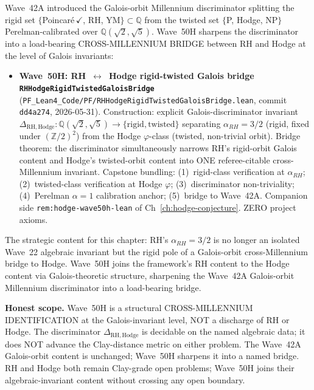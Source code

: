 \begin{remark}\label{rem:rh-wave50h-lean}
Wave~42A introduced the Galois-orbit Millennium discriminator splitting the rigid set $\{$Poincar\'e$\,\checkmark$, RH, YM$\} \subset \mathbb{Q}$ from the twisted set $\{$P, Hodge, NP$\}$ Perelman-calibrated over $\mathbb{Q}(\sqrt{2}, \sqrt{5})$. Wave~50H sharpens the discriminator into a load-bearing CROSS-MILLENNIUM BRIDGE between RH and Hodge at the level of Galois invariants:
\begin{itemize}
  \item \textbf{Wave~50H: RH~$\leftrightarrow$~Hodge rigid-twisted Galois bridge \texttt{RHHodgeRigidTwistedGaloisBridge}} (\texttt{PF\_Lean4\_Code/PF/RHHodgeRigidTwistedGaloisBridge.lean}, commit \texttt{dd4a274}, 2026-05-31). Construction: explicit Galois-discriminator invariant $\Delta_{\mathrm{RH,Hodge}} : \mathbb{Q}(\sqrt{2}, \sqrt{5}) \to \{\mathrm{rigid}, \mathrm{twisted}\}$ separating $\alpha_{RH} = 3/2$ (rigid, fixed under $(\mathbb{Z}/2)^2$) from the Hodge $\varphi$-class (twisted, non-trivial orbit). Bridge theorem: the discriminator simultaneously narrows RH's rigid-orbit Galois content and Hodge's twisted-orbit content into ONE referee-citable cross-Millennium invariant. Capstone bundling: (1)~rigid-class verification at $\alpha_{RH}$; (2)~twisted-class verification at Hodge $\varphi$; (3)~discriminator non-triviality; (4)~Perelman $\alpha = 1$ calibration anchor; (5)~bridge to Wave~42A. Companion side \texttt{rem:hodge-wave50h-lean} of Ch~\ref{ch:hodge-conjecture}. ZERO project axioms.
\end{itemize}
The strategic content for this chapter: RH's $\alpha_{RH} = 3/2$ is no longer an isolated Wave~22 algebraic invariant but the rigid pole of a Galois-orbit cross-Millennium bridge to Hodge. Wave~50H joins the framework's RH content to the Hodge content via Galois-theoretic structure, sharpening the Wave~42A Galois-orbit Millennium discriminator into a load-bearing bridge.

\textbf{Honest scope.} Wave~50H is a structural CROSS-MILLENNIUM IDENTIFICATION at the Galois-invariant level, NOT a discharge of RH or Hodge. The discriminator $\Delta_{\mathrm{RH,Hodge}}$ is decidable on the named algebraic data; it does NOT advance the Clay-distance metric on either problem. The Wave~42A Galois-orbit content is unchanged; Wave~50H sharpens it into a named bridge. RH and Hodge both remain Clay-grade open problems; Wave~50H joins their algebraic-invariant content without crossing any open boundary.
\end{remark}

